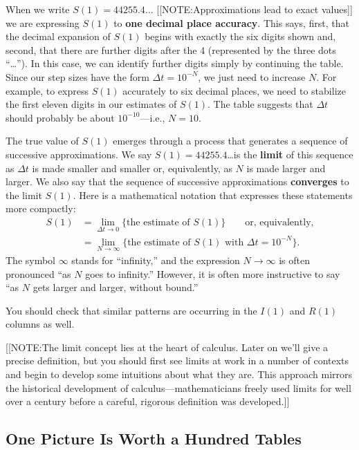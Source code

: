 When we write $S(1) = 44255.4\ldots$ 
[[NOTE:Approximations lead to exact values]] 
we are expressing $S(1)$ to {\bf one decimal place
  accuracy}. This
says, first, that the decimal expansion of $S(1)$ begins with exactly
the six digits shown and, second, that there are further digits after
the 4 (represented by the three dots ``\ldots'')\label{`dotdot'}.  In
this case, we can identify further digits simply by continuing the
table.  Since our step sizes have the form $\Delta t = 10^{-N}$, we
just need to increase $N$.  For example, to express $S(1)$ accurately
to six decimal places, we need to stabilize the first eleven digits in
our estimates of $S(1)$.  The table suggests that $\Delta t$ should
probably be about $10^{-10}$---i.e., $N = 10$.

The true value of $S(1)$ emerges through a process that generates a
sequence of successive approximations.
We say $S(1) = 44255.4$\ldots is the {\bf limit} of this
sequence as $\Delta t$ is made smaller and smaller or, equivalently,
as $N$ is made larger and larger.  We also say that the sequence of
successive approximations {\bf converges} to the limit $S(1)$.  Here is a mathematical notation that
expresses these statements more compactly:
\begin{align*}
	S(1) &= \lim_{\Delta t \to 0}
   \{\mbox{the estimate of $S(1)$}\} \qquad \mbox{or, equivalently,}\\
	&= \lim_{N \to \infty}
		\{\mbox{the estimate of $S(1)$ 
		with $\Delta t = 10^{-N}$}\}.
\end{align*}
The symbol $\infty$ stands for ``infinity,'' and the expression $N \to
\infty$ is often pronounced ``as $N$ goes to infinity.''  However, it
is often more instructive to say ``as $N$ gets larger and larger,
without bound.''

You should check that similar patterns are occurring in the $I(1)$ and
$R(1)$ columns as well.

[[NOTE:The limit concept lies at the heart of calculus.  Later on
  we'll give a precise definition, but you should first see limits at
  work in a number of contexts and begin to develop some intuitions
  about what they are.  This approach mirrors the historical
  development of calculus---mathematicians freely used limits for well
  over a century before a careful, rigorous definition was developed.]]

\subsection{One Picture Is Worth a Hundred Tables}
\label{subsec:one-picture-is-worth-a-hundred-tables}

